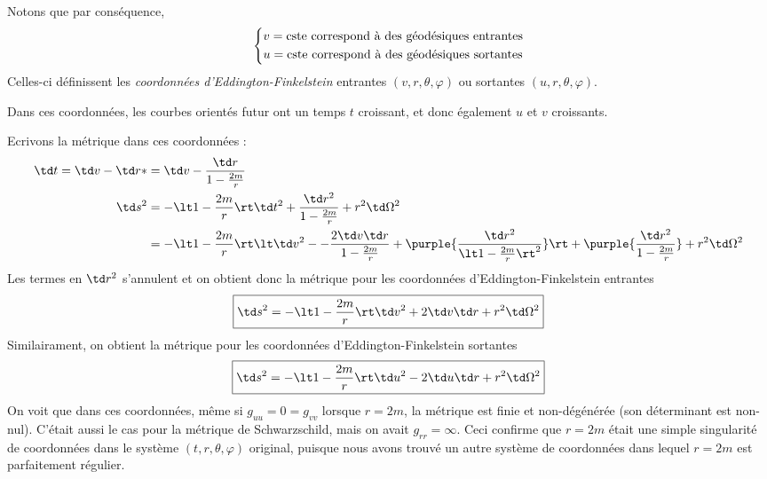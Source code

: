 Notons que par conséquence,
\begin{equation}
    \begin{dcases}
        v = \text{cste correspond à des géodésiques entrantes}\\
        u = \text{cste correspond à des géodésiques sortantes}
    \end{dcases}
\end{equation}
Celles-ci définissent les \emph{coordonnées d'Eddington-Finkelstein} entrantes $(v,r,\theta,\varphi)$ ou sortantes $(u,r,\theta,\varphi)$.
\begin{rmk}
    Dans ces coordonnées, les courbes orientés futur ont un temps $t$ croissant, et donc également $u$ et $v$ croissants.
\end{rmk}
Ecrivons la métrique dans ces coordonnées :
\begin{align}
    \td t = \td v - \td r*& = \td v - \frac{\td r}{1 - \frac{2m}{r}}\\
    \td s^2 &= - \lt 1 - \frac{2m}{r} \rt \td t^2 + \frac{\td r^2}{1 -\frac{2m}{r}} +r^2\td \Omega^2\\
    & = - \lt 1 - \frac{2m}{r} \rt \lt \td v^2 - - \frac{2\td v \td r}{1 - \frac{2m}{r}} + \purple{\frac{\td r^2}{\lt 1 - \frac{2m}{r} \rt^2}} \rt + \purple{\frac{\td r^2}{1 - \frac{2m}{r}}} + r^2 \td \Omega^2
\end{align}
Les termes en $\td r^2$ s'annulent et on obtient donc la métrique pour les coordonnées d'Eddington-Finkelstein entrantes
\begin{equation}
    \label{métrique EF entrant}
    \boxed{\td s^2  = - \lt 1 - \frac{2m}{r} \rt \td v^2 + 2 \td v \td r + r^2 \td \Omega^2}
\end{equation}
Similairament, on obtient la métrique pour les coordonnées d'Eddington-Finkelstein sortantes
\begin{equation}
    \label{métrique EF sortant}
    \boxed{\td s^2  = - \lt 1 - \frac{2m}{r} \rt \td u^2 - 2 \td u \td r + r^2 \td \Omega^2}
\end{equation}
On voit que dans ces coordonnées, même si $g_{uu} = 0 = g_{vv}$ lorsque $r=2m$, la métrique est finie et non-dégénérée (son déterminant est non-nul). C'était aussi le cas pour la métrique de Schwarzschild, mais on avait $g_{rr} = \infty$. Ceci confirme que $r=2m$ était une simple singularité de coordonnées dans le système $(t,r,\theta,\varphi)$ original, puisque nous avons trouvé un autre système de coordonnées dans lequel $r=2m$ est parfaitement régulier. \\
\\
